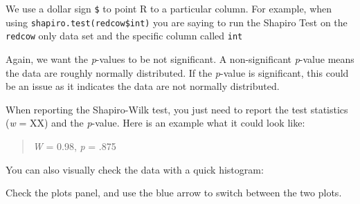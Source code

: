 \documentclass[
]{book}
\newenvironment{Shaded}{\begin{snugshade}}{\end{snugshade}}
\newcommand{\CommentTok}[1]{\textcolor[rgb]{0.56,0.35,0.01}{\textit{#1}}}
\newcommand{\FunctionTok}[1]{\textcolor[rgb]{0.13,0.29,0.53}{\textbf{#1}}}
\newcommand{\NormalTok}[1]{#1}
\newcommand{\OtherTok}[1]{\textcolor[rgb]{0.56,0.35,0.01}{#1}}
\newcommand{\SpecialCharTok}[1]{\textcolor[rgb]{0.81,0.36,0.00}{\textbf{#1}}}
\newcommand{\StringTok}[1]{\textcolor[rgb]{0.31,0.60,0.02}{#1}}
\begin{document}
\begin{Shaded}
\end{Shaded}

We use a dollar sign \texttt{\$} to point R to a particular column. For example, when using \texttt{shapiro.test(redcow\$int)} you are saying to run the Shapiro Test on the \texttt{redcow} only data set and the specific column called \texttt{int}

Again, we want the \emph{p}-values to be not significant. A non-significant \emph{p}-value means the data are roughly normally distributed. If the \emph{p}-value is significant, this could be an issue as it indicates the data are not normally distributed.

When reporting the Shapiro-Wilk test, you just need to report the test statistics (\emph{w} = XX) and the \emph{p}-value. Here is an example what it could look like:

\begin{quote}
\emph{W} = 0.98, \emph{p} = .875
\end{quote}

You can also visually check the data with a quick histogram:

\begin{Shaded}
\end{Shaded}

Check the plots panel, and use the blue arrow to switch between the two plots.
\end{document}
